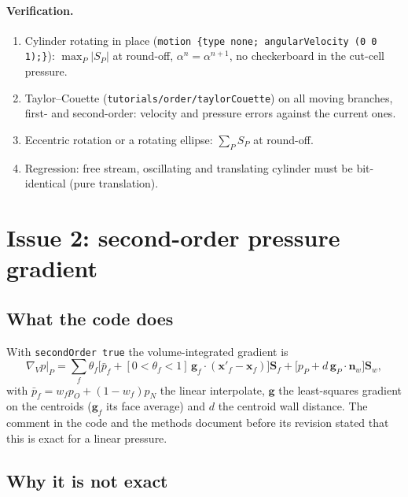 \documentclass[11pt,a4paper]{article}
\theoremstyle{remark}
\newcommand{\nn}{\bm{n}}
\newcommand{\xx}{\bm{x}}
\newcommand{\Sf}{\bm{S}_f}
\newcommand{\Sw}{\bm{S}_w}
\newcommand{\code}[1]{\texttt{#1}}
\newcommand{\gradV}{\nabla_{\!V}}
\begin{document}
\paragraph{Verification.}
\begin{enumerate}\itemsep1pt
\item Cylinder rotating in place (\code{motion \{type none; angularVelocity (0 0 1);\}}):
      $\max_P|S_P|$ at round-off, $\alpha^n=\alpha^{n+1}$, no checkerboard in the cut-cell
      pressure.
\item Taylor--Couette (\code{tutorials/order/taylorCouette}) on all moving branches, first- and
      second-order: velocity and pressure errors against the current ones.
\item Eccentric rotation or a rotating ellipse: $\sum_PS_P$ at round-off.
\item Regression: free stream, oscillating and translating cylinder must be bit-identical
      (pure translation).
\end{enumerate}

\section{Issue 2: second-order pressure gradient}

\subsection{What the code does}

With \code{secondOrder true} the volume-integrated gradient is
\begin{equation}
\gradV p\big|_P=\sum_f\theta_f\Big[\bar p_f+[0<\theta_f<1]\,\bm g_f\cdot(\xx'_f-\xx_f)\Big]\Sf
+\big[p_P+d\,\bm g_P\cdot\nn_w\big]\Sw ,
\label{eq:grad2}
\end{equation}
with $\bar p_f=w_fp_O+(1-w_f)p_N$ the linear interpolate, $\bm g$ the least-squares gradient on
the centroids ($\bm g_f$ its face average) and $d$ the centroid wall distance. The comment in the
code and the methods document before its revision stated that this is exact for a linear pressure.

\subsection{Why it is not exact}
\end{document}
